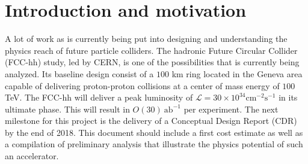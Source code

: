 
\section{Introduction and motivation}
\label{sec:intro}


A lot of work as is currently being put into designing and understanding the physics reach of future particle colliders. The hadronic Future Circular Collider (FCC-hh) study, led by CERN, is one of the possibilities that is currently being analyzed. Its baseline design consist of a $100$ km ring located in the Geneva area capable of delivering proton-proton collisions at a center of mass energy of $100$ TeV. The FCC-hh will deliver a peak luminosity of $\mathcal{L}=30\times 10^{34} \text{cm}^{-2}\text{s}^{-1}$ in its ultimate phase. This will result in $O(30)~\text{ab}^{-1}$ per experiment. The next milestone for this project is the delivery of a Conceptual Design Report (CDR) by the end of 2018. This document should include a first cost estimate as well as a compilation of preliminary analysis that illustrate the physics potential of such an accelerator.

